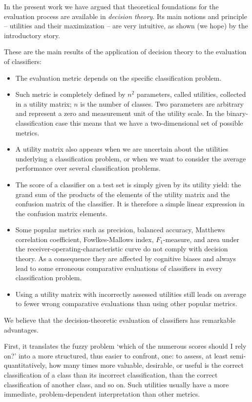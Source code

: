 \documentclass[\ifafour a4paper,12pt,\else a5paper,10pt,\fi%
onecolumn,oneside,article,%
british%
]{memoir}
\theoremstyle{remark}
\theoremstyle{innote}
\renewcommand*{\|}[1][]{\nonscript\:#1\vert\nonscript\:\mathopen{}}
\begin{document}
In the present work we have argued that theoretical foundations for the evaluation process are available in \emph{decision theory}. Its main notions and principle -- utilities and their maximization -- are very intuitive, as shown (we hope) by the introductory story.

These are the main results of the application of decision theory to the evaluation of classifiers:
\begin{itemize}[--,wide]
\item The evaluation metric depends on the specific classification problem.
\item Such metric is completely defined by $n^{2}$ parameters, called utilities, collected in a utility matrix; $n$ is the number of classes. Two parameters are arbitrary and represent a zero and measurement unit of the utility scale. In the binary-classification case this means that we have a two-dimensional set of possible metrics.
\item A utility matrix also appears when we are uncertain about the utilities underlying a classification problem, or when we want to consider the average performance over several classification problems.
\item The score of a classifier on a test set is simply given by its utility yield: the grand sum of the products of the elements of the utility matrix and the confusion matrix of the classifier. It is therefore a simple linear expression in the confusion matrix elements.
\item Some popular metrics such as precision, balanced accuracy, Matthews correlation coefficient, Fowlkes-Mallows index, $F_{1}$-measure, and area under the receiver-operating-characteristic curve do not comply with decision theory. As a consequence they are affected by cognitive biases and always lead to some erroneous comparative evaluations of classifiers in every classification problem.
\item Using a utility matrix with incorrectly assessed utilities still leads on average to fewer wrong comparative evaluations than using other popular metrics.
\end{itemize}

We believe that the decision-theoretic evaluation of classifiers has remarkable advantages.

First, it translates the fuzzy problem \enquote*{which of the numerous scores should I rely on?} into a more structured, thus easier to confront, one: to assess, at least semi-quantitatively, how many times more valuable, desirable, or useful is the correct classification of a class than its incorrect classification, than the correct classification of another class, and so on. Such utilities usually have a more immediate, problem-dependent interpretation than other metrics.
\end{document}
